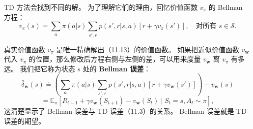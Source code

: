 \documentclass[UTF8,12pt,a4paper,fontset=fandol]{ctexart}
\begin{document}
TD 方法会找到不同的解。
为了理解它们的理由，回忆价值函数 $v_\pi$ 的 Bellman 方程：
\begin{equation}
v_\pi(s)=\sum_a\pi(a|s)\sum_{s',r}p(s',r|s,a)\left[r+\gamma v_\pi(s')\right],
\quad \text{对所有 }s\in\mathcal{S}.
\tag{11.13}
\end{equation}

\begin{center}
\end{center}

真实价值函数 $v_\pi$ 是唯一精确解出（11.13）的价值函数。
如果把近似价值函数 $v_{\mathbf{w}}$ 代入 $v_\pi$ 的位置，那么修改后方程右侧与左侧的差，可以用来度量 $v_{\mathbf{w}}$ 离 $v_\pi$ 有多远。
我们把它称为状态 $s$ 处的 \textbf{Bellman 误差}：
\begin{equation}
\bar\delta_{\mathbf{w}}(s)\doteq
\left(\sum_a\pi(a|s)\sum_{s',r}p(s',r|s,a)\left[r+\gamma v_{\mathbf{w}}(s')\right]\right)-v_{\mathbf{w}}(s)
\tag{11.17}
\end{equation}
\begin{equation}
=\mathbb{E}_\pi\left[R_{t+1}+\gamma v_{\mathbf{w}}(S_{t+1})-v_{\mathbf{w}}(S_t)\mid S_t=s,A_t\sim\pi\right],
\tag{11.18}
\end{equation}
这清楚显示了 Bellman 误差与 TD 误差（11.3）的关系。
Bellman 误差就是 TD 误差的期望。
\end{document}
